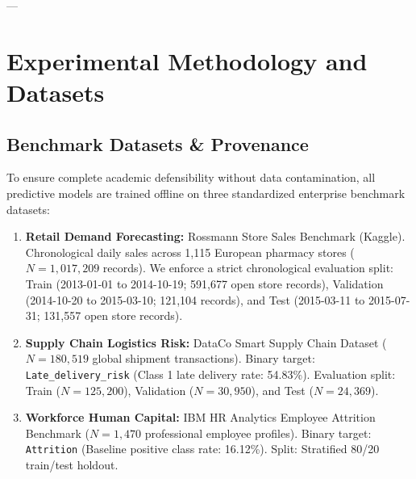 \documentclass[journal]{IEEEtran}
\begin{document}
---

\section{Experimental Methodology and Datasets}

\subsection{Benchmark Datasets & Provenance}
To ensure complete academic defensibility without data contamination, all predictive models are trained offline on three standardized enterprise benchmark datasets:
\begin{enumerate}
    \item \textbf{Retail Demand Forecasting:} Rossmann Store Sales Benchmark (Kaggle). Chronological daily sales across 1,115 European pharmacy stores ($N = 1,017,209$ records). We enforce a strict chronological evaluation split: Train (2013-01-01 to 2014-10-19; 591,677 open store records), Validation (2014-10-20 to 2015-03-10; 121,104 records), and Test (2015-03-11 to 2015-07-31; 131,557 open store records).
    \item \textbf{Supply Chain Logistics Risk:} DataCo Smart Supply Chain Dataset ($N = 180,519$ global shipment transactions). Binary target: \texttt{Late\_delivery\_risk} (Class 1 late delivery rate: 54.83\%). Evaluation split: Train ($N=125,200$), Validation ($N=30,950$), and Test ($N=24,369$).
    \item \textbf{Workforce Human Capital:} IBM HR Analytics Employee Attrition Benchmark ($N = 1,470$ professional employee profiles). Binary target: \texttt{Attrition} (Baseline positive class rate: 16.12\%). Split: Stratified 80/20 train/test holdout.
\end{enumerate}
\end{document}
